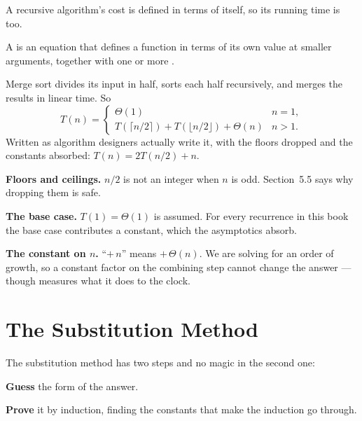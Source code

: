A recursive algorithm's cost is defined in terms of itself, so its running time
is too.

\begin{definitionbox}[Recurrence]
A  is an equation that defines a function in terms of its own
value at smaller arguments, together with one or more .

\smallskip
Merge sort divides its input in half, sorts each half recursively, and merges
the results in linear time. So
\[ T(n) = \begin{cases}
   \Theta(1) & n = 1, \\
   T(\lceil n/2 \rceil) + T(\lfloor n/2 \rfloor) + \Theta(n) & n > 1.
   \end{cases} \]
Written as algorithm designers actually write it, with the floors dropped and
the constants absorbed: $T(n) = 2T(n/2) + n$.
\end{definitionbox}

\begin{alertbox}
\begin{tightnum}
  \item \textbf{Floors and ceilings.} $n/2$ is not an integer when $n$ is odd.
        Section~5.5 says why dropping them is safe.
  \item \textbf{The base case.} $T(1) = \Theta(1)$ is assumed. For every
        recurrence in this book the base case contributes a constant, which the
        asymptotics absorb.
  \item \textbf{The constant on $n$.} ``$+\,n$'' means $+\,\Theta(n)$. We are
        solving for an order of growth, so a constant factor on the combining
        step cannot change the answer --- though  measures
        what it does to the clock.
\end{tightnum}
\end{alertbox}

\section{The Substitution Method}

The substitution method has two steps and no magic in the second one:

\begin{tightnum}
  \item \textbf{Guess} the form of the answer.
  \item \textbf{Prove} it by induction, finding the constants that make the
        induction go through.
\end{tightnum}

